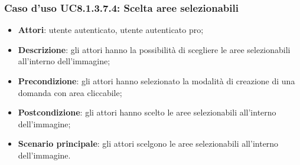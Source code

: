 \subsubsection{Caso d'uso UC8.1.3.7.4: Scelta aree selezionabili}
\begin{itemize}
	\item \textbf{Attori}: utente autenticato, utente autenticato pro;
	\item \textbf{Descrizione}: gli attori hanno la possibilità di scegliere le aree selezionabili all'interno dell'immagine;
	\item \textbf{Precondizione}: gli attori hanno selezionato la modalità di creazione di una domanda con area cliccabile; 
	\item \textbf{Postcondizione}: gli attori hanno scelto le aree selezionabili all'interno dell'immagine;
	\item \textbf{Scenario principale}: gli attori scelgono le aree selezionabili all'interno dell'immagine. 	
\end{itemize}

